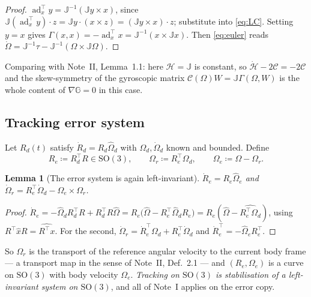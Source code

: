 \documentclass[11pt,a4paper]{article}
\newcommand{\Gm}{\mathbb{G}}
\newcommand{\Jm}{\mathbb{J}}
\newcommand{\SO}{\mathrm{SO}(3)}
\newcommand{\adt}{\operatorname{ad}^{\top}}
\newcommand{\Ome}{\Omega_{\!e}}
\newcommand{\Omr}{\Omega_{\!r}}
\theoremstyle{plain}
\newtheorem{lemma}[theorem]{Lemma}
\theoremstyle{definition}
\theoremstyle{remark}
\begin{document}
\begin{proof}
$\adt_x y = \Jm^{-1}(\Jm y\times x)$, since
$\Jm(\adt_xy)\cdot z = \Jm y\cdot(x\times z) = (\Jm y\times x)\cdot z$; substitute
into \eqref{eq:LC}. Setting $y=x$ gives $\Gamma(x,x) = -\adt_xx = \Jm^{-1}(x\times\Jm x)$.
Then \eqref{eq:euler} reads $\dot\Omega = \Jm^{-1}\tau - \Jm^{-1}(\Omega\times\Jm\Omega)$.
\end{proof}

Comparing with Note~II, Lemma~1.1: here $\mathcal{H}=\Jm$ is constant, so
$\dot{\mathcal{H}} - 2\mathcal{C} = -2\mathcal{C}$ and the skew-symmetry of the
gyroscopic matrix $\mathcal{C}(\Omega)W = \Jm\Gamma(\Omega,W)$ is the whole content
of $\nabla\Gm=0$ in this case.

\subsection{Tracking error system}

Let $R_d(t)$ satisfy $\dot R_d = R_d\hat\Omega_d$ with $\Omega_d,\dot\Omega_d$ known
and bounded. Define
\begin{equation}
  R_e \coloneqq R_d^{\top}R \in \SO,
  \qquad
  \Omr \coloneqq R_e^{\top}\Omega_d,
  \qquad
  \Ome \coloneqq \Omega - \Omr .
  \label{eq:so3-err}
\end{equation}

\begin{lemma}[The error system is again left-invariant]
\label{lem:err-kin}
$\dot R_e = R_e\hat\Ome$ and $\dot\Omr = R_e^{\top}\dot\Omega_d - \Ome\times\Omr$.
\end{lemma}

\begin{proof}
$\dot R_e = -\hat\Omega_dR_d^{\top}R + R_d^{\top}R\hat\Omega
= R_e\big(\hat\Omega - R_e^{\top}\hat\Omega_dR_e\big) = R_e(\hat\Omega - \widehat{R_e^{\top}\Omega_d})$,
using $R^{\top}\hat xR = \widehat{R^{\top}x}$. For the second,
$\dot\Omr = \dot R_e^{\top}\Omega_d + R_e^{\top}\dot\Omega_d$ and
$\dot R_e^{\top} = -\hat\Ome R_e^{\top}$.
\end{proof}

So $\Omr$ is the transport of the reference angular velocity to the current body
frame --- a transport map in the sense of Note~II, Def.~2.1 --- and $(R_e,\Ome)$ is
a curve on $\SO$ with body velocity $\Ome$. \emph{Tracking on $\SO$ is
stabilisation of a left-invariant system on $\SO$}, and all of Note~I applies on
the error copy.

\end{document}
